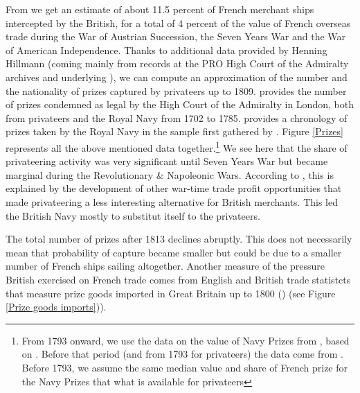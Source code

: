 \documentclass[12pt,a4paper,notitlepage,english]{article}
\begin{document}
From \cite{Hillmann2011} we get an estimate of about 11.5 percent of French merchant ships intercepted by the British, for a total of 4 percent of the value of French overseas trade during the War of Austrian Succession, the Seven Years War and the War of American Independence. Thanks to additional data provided by Henning Hillmann (coming mainly from records at the PRO High Court of the Admiralty archives and underlying \cite{Hillmann2011}), we can compute an approximation of the number and the nationality of prizes captured by privateers up to 1809. 
\cite{Starkey1990} provides the number of prizes condemned as legal by the High Court of the Admiralty in London, both from privateers and the Royal Navy from 1702 to 1785. 
\cite{Benjamin2009} provides a chronology of prizes taken by the Royal Navy in the sample first gathered by \cite{Hill1998}.
Figure \ref{Prizes} represents all the above mentioned data together.\footnote{From 1793 onward, we use the data on the value of Navy Prizes from \cite{Benjamin2009}, based on \cite{Hill1998}. Before that period (and from 1793 for privateers) the data come from \cite{Starkey1990,Hillmann2011}. Before 1793, we assume the same median value and share of French prize for the Navy Prizes that what is available for privateers }
We see here that the share of privateering activity was very significant until Seven Years War but became marginal during the Revolutionary \& Napoleonic Wars. According to \cite{Hillmann2011}, this is explained by the development of other war-time trade profit opportunities that made privateering a less interesting alternative for British merchants. This led the British Navy mostly to substitut itself to the privateers.

The total number of prizes after 1813 declines abruptly. This does not necessarily mean that probability of capture became smaller but could be due to a smaller number of French ships sailing altogether.  
Another measure of the pressure British exercised on French trade comes from English and British trade statistcts that measure prize goods imported in Great Britain up to 1800 (\cite{Ashton1960}) (see Figure \ref{Prize goods imports})).
\end{document}
